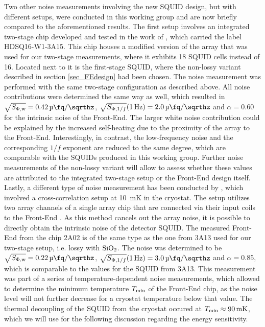 Two other noise measurements involving the new SQUID design, but with different setups, were conducted in this working group and are now briefly compared to the aforementioned results. The first setup involves an integrated two-stage chip developed and tested in the work of \cite{Kraemer2023}, which carried the label HDSQ16-W1-3A15. This chip houses a modified version of the array that was used for our two-stage measurements, where it exhibits 18 SQUID cells instead of 16. Located next to it is the first-stage SQUID, where the non-lossy variant described in section \ref{sec_FEdesign} had been chosen. The noise measurement was performed with the same two-stage configuration as described above. All noise contributions were determined the same way as well, which resulted in $\sqrt{S_{\rm \Phi,w}}=\qty{0.42}{\micro\fq\per\sqrthz}$, $\sqrt{S_{{\rm \Phi},1/f}}(\qty{1}{\Hz})=\qty{2.0}{\micro\fq\per\sqrthz}$ and $\alpha=0.60$ for the  intrinsic noise of the Front-End. The larger white noise contribution could be explained by the increased self-heating due to the proximity of the array to the Front-End. Interestingly, in contrast, the low-frequency noise and the corresponding $1/f$ exponent are reduced to the same degree, which are comparable with the SQUIDs produced in this working group. Further noise measurements of the non-lossy variant will allow to assess whether these values are attributed to the integrated two-stage setup or the Front-End design itself. \\
Lastly, a different type of noise measurement has been conducted by \cite{Mazibrada2024}, which involved a cross-correlation setup at \qty{10}{\milli\kelvin} in the cryostat. The setup utilizes two array channels of a single array chip that are connected via their input coils to the Front-End \cite{}. As this method cancels out the array noise, it is possible to directly obtain the intrinsic noise of the detector SQUID. The measured Front-End from the chip 2A02 is of the same type as the one from 3A13 used for our two-stage setup, i.e. lossy with ${\rm SiO_2}$. The noise was determined to be $\sqrt{S_{\rm \Phi,w}}=\qty{0.22}{\micro\fq\per\sqrthz}$, $\sqrt{S_{{\rm \Phi},1/f}}(\qty{1}{\Hz})=\qty{3.0}{\micro\fq\per\sqrthz}$ and $\alpha=0.85$, which is comparable to the values for the SQUID from 3A13. This measurement was part of a series of temperature-dependent noise measurements, which allowed to determine the minimum temperature $T_{\rm min}$ of the Front-End chip, as the noise level will not further decrease for a cryostat temperature below that value. The thermal decoupling of the SQUID from the cryostat occured at $T_{\rm min}\approx\qty{90}{\milli\kelvin}$, which we will use for the following discussion regarding the energy sensitivity. \\

